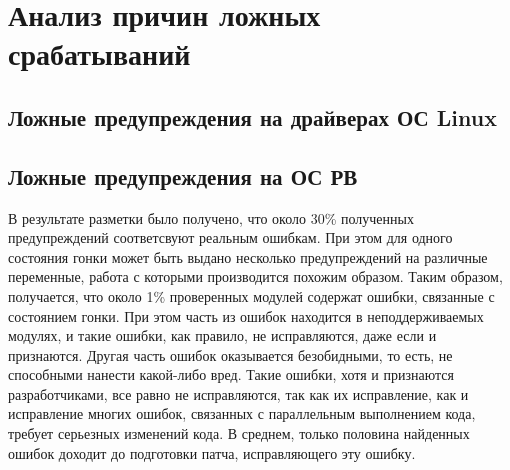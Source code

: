 \section{Анализ причин ложных срабатываний}

\subsection{Ложные предупреждения на драйверах ОС Linux}

\subsection{Ложные предупреждения на ОС РВ}











В результате разметки было получено, что около 30\% полученных предупреждений соответсвуют реальным ошибкам. 
При этом для одного состояния гонки может быть выдано несколько предупреждений на различные переменные, работа с которыми производится похожим образом.
Таким образом, получается, что около 1\% проверенных модулей содержат ошибки, связанные с состоянием гонки.
При этом часть из ошибок находится в неподдерживаемых модулях, и такие ошибки, как правило, не исправляются, даже если и признаются. 
Другая часть ошибок оказывается безобидными, то есть, не способными нанести какой-либо вред.
Такие ошибки, хотя и признаются разработчиками, все равно не исправляются, так как их исправление, как и исправление многих ошибок, связанных с параллельным выполнением кода, требует серьезных изменений кода.
В среднем, только половина найденных ошибок доходит до подготовки патча, исправляющего эту ошибку.

